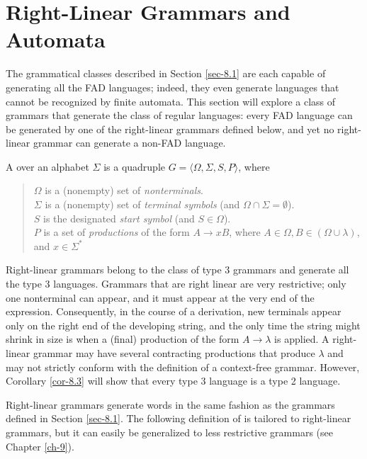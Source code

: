 \section{Right-Linear Grammars and Automata}\label{sec-8.2}

The grammatical classes described in Section \ref{sec-8.1} are each capable of generating
all the FAD languages; indeed, they even generate languages that cannot be
recognized by finite automata. This section will explore a class of grammars
that generate the class of regular languages: every FAD language can be
generated by one of the right-linear grammars defined below, and yet no
right-linear grammar can generate a non-FAD language.

\begin{dfn}\label{dfn-8.7}
A \emph{} over an alphabet $\Sigma$ is a quadruple
$G=\langle\Omega,\Sigma,S,P\rangle$, where

\begin{quote}
$\Omega$ is a (nonempty) set of \emph{nonterminals}. \\
$\Sigma$ is a (nonempty) set of \emph{terminal symbols} (and $\Omega\cap\Sigma =
	\emptyset$). \\
$S$ is the designated \emph{start symbol} (and $S\in\Omega$). \\
$P$ is a set of \emph{productions} of the form $A\rightarrow xB$, where $A\in\Omega, B
	\in(\Omega\cup\lambda)$, and $x\in\Sigma^*$
\end{quote}
\end{dfn}

Right-linear grammars belong to the class of type 3 grammars and generate all
the type 3 languages. Grammars that are right linear are very restrictive;
only one nonterminal can appear, and it must appear at the very end of the
expression. Consequently, in the course of a derivation, new terminals appear
only on the right end of the developing string, and the only time the string
might shrink in size is when a (final) production of the form $A \rightarrow
\lambda$ is applied. A right-linear grammar may have several contracting
productions that produce $\lambda$ and may not strictly conform with the
definition of a context-free grammar. However, Corollary \ref{cor-8.3} will show that
every type 3 language is a type 2 language.

Right-linear grammars generate words in the same fashion as the grammars
defined in Section \ref{sec-8.1}. The following definition of \emph{} is
tailored to right-linear grammars, but it can easily be generalized to less
restrictive grammars (see Chapter \ref{ch-9}).

